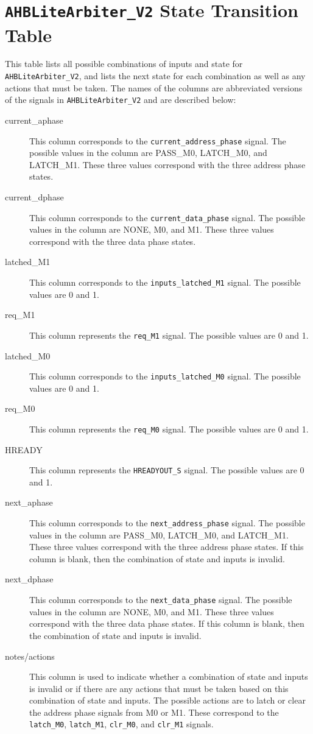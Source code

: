 \section{\texttt{AHBLiteArbiter\_V2} State Transition Table} \label{appendix:arb-fsm}
This table lists all possible combinations of inputs and state for \texttt{AHBLiteArbiter\_V2}, and lists the next state for each combination as well as any actions that must be taken. The names of the columns are abbreviated versions of the signals in \texttt{AHBLiteArbiter\_V2} and are described below:

\begin{description}
	\item[current\_aphase] This column corresponds to the \texttt{current\_address\_phase} signal. The possible values in the column are PASS\_M0, LATCH\_M0, and LATCH\_M1. These three values correspond with the three address phase states.
	\item[current\_dphase] This column corresponds to the \texttt{current\_data\_phase} signal. The possible values in the column are NONE, M0, and M1. These three values correspond with the three data phase states.
	\item[latched\_M1] This column corresponds to the \texttt{inputs\_latched\_M1} signal. The possible values are 0 and 1.
	\item[req\_M1] This column represents the \texttt{req\_M1} signal. The possible values are 0 and 1.
	\item[latched\_M0] This column corresponds to the \texttt{inputs\_latched\_M0} signal. The possible values are 0 and 1.
	\item[req\_M0] This column represents the \texttt{req\_M0} signal. The possible values are 0 and 1.
	\item[HREADY] This column represents the \texttt{HREADYOUT\_S} signal. The possible values are 0 and 1.
	\item[next\_aphase] This column corresponds to the \texttt{next\_address\_phase} signal. The possible values in the column are PASS\_M0, LATCH\_M0, and LATCH\_M1. These three values correspond with the three address phase states. If this column is blank, then the combination of state and inputs is invalid.
	\item[next\_dphase] This column corresponds to the \texttt{next\_data\_phase} signal. The possible values in the column are NONE, M0, and M1. These three values correspond with the three data phase states. If this column is blank, then the combination of state and inputs is invalid.
	\item[notes/actions] This column is used to indicate whether a combination of state and inputs is invalid or if there are any actions that must be taken based on this combination of state and inputs. The possible actions are to latch or clear the address phase signals from M0 or M1. These correspond to the \texttt{latch\_M0}, \texttt{latch\_M1}, \texttt{clr\_M0}, and \texttt{clr\_M1} signals.
\end{description}

\setlength{\LTleft}{-20cm plus -1fill}
\setlength{\LTright}{\LTleft}
\tiny{}



